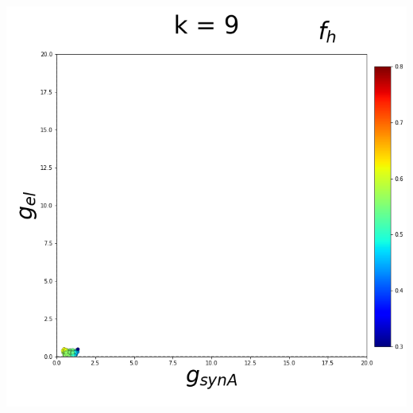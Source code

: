 \documentclass[11pt]{article}
\begin{document}
\begin{center}
\includegraphics[scale=0.125]{DSN_figs/STGCircuit_DSN_c=2_rs=1_k=9.png}
\end{center}
\end{document}
